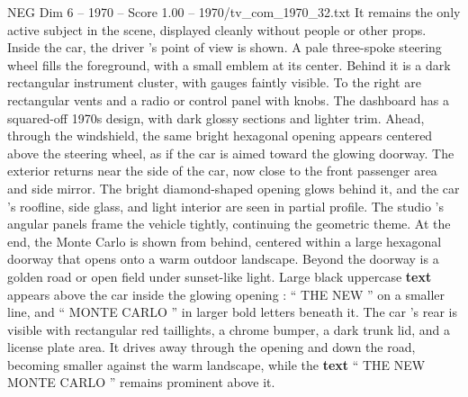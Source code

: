 \begin{textsample}{NEG Dim 6 – 1970 – Score 1.00 – 1970/tv\_com\_1970\_32.txt}
It remains the only active subject in the scene, displayed cleanly without people or other props.
Inside the car, the driver ’s point of view is shown.
A pale three-spoke steering wheel fills the foreground, with a small emblem at its center.
Behind it is a dark rectangular instrument cluster, with gauges faintly visible.
To the right are rectangular vents and a radio or control panel with knobs.
The dashboard has a squared-off 1970s design, with dark glossy sections and lighter trim.
Ahead, through the windshield, the same bright hexagonal opening appears centered above the steering wheel, as if the car is aimed toward the glowing doorway.
The exterior returns near the side of the car, now close to the front passenger area and side mirror.
The bright diamond-shaped opening glows behind it, and the car ’s roofline, side glass, and light interior are seen in partial profile.
The studio ’s angular panels frame the vehicle tightly, continuing the geometric theme.
At the end, the Monte Carlo is shown from behind, centered within a large hexagonal doorway that opens onto a warm outdoor landscape.
Beyond the doorway is a golden road or open field under sunset-like light.
Large black uppercase \textbf{text} appears above the car inside the glowing opening : “ THE NEW ” on a smaller line, and “ MONTE CARLO ” in larger bold letters beneath it.
The car ’s rear is visible with rectangular red taillights, a chrome bumper, a dark trunk lid, and a license plate area.
It drives away through the opening and down the road, becoming smaller against the warm landscape, while the \textbf{text} “ THE NEW MONTE CARLO ” remains prominent above it.

\end{textsample}
